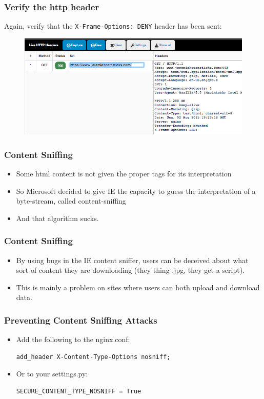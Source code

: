 \documentclass[9pt]{beamer}
\begin{document}
\begin{frame}
\frametitle{Verify the http header}
Again, verify that the \texttt{X-Frame-Options: DENY} header has been sent:
\begin{figure}
\includegraphics[scale=0.35]{./figures/debugging_http_headers.png}
\end{figure}
\end{frame}

\begin{frame}[fragile]
\frametitle{Content Sniffing}
\begin{itemize}
\item Some html content is not given the proper tags for its interpretation
\pause
\item So Microsoft decided to give IE the capacity to guess the interpretation of a byte-stream, called content-sniffing
\pause
\item And that algorithm sucks.
\end{itemize}
\end{frame}

\begin{frame}[fragile]
\frametitle{Content Sniffing}
\begin{itemize}
\item By using bugs in the IE content sniffer, users can be deceived about what sort of content they are downloading (they thing .jpg, they get a script).
\pause
\item This is mainly a problem on sites where users can both upload and download data.
\end{itemize}
\end{frame}

\begin{frame}[fragile]
\frametitle{Preventing Content Sniffing Attacks}
\begin{itemize}
\item Add the following to the nginx.conf:
\begin{verbatim}
add_header X-Content-Type-Options nosniff;
\end{verbatim}
\pause
\item Or to your settings.py:
\begin{verbatim}
SECURE_CONTENT_TYPE_NOSNIFF = True
\end{verbatim}
\end{itemize}
\end{frame}
\end{document}
